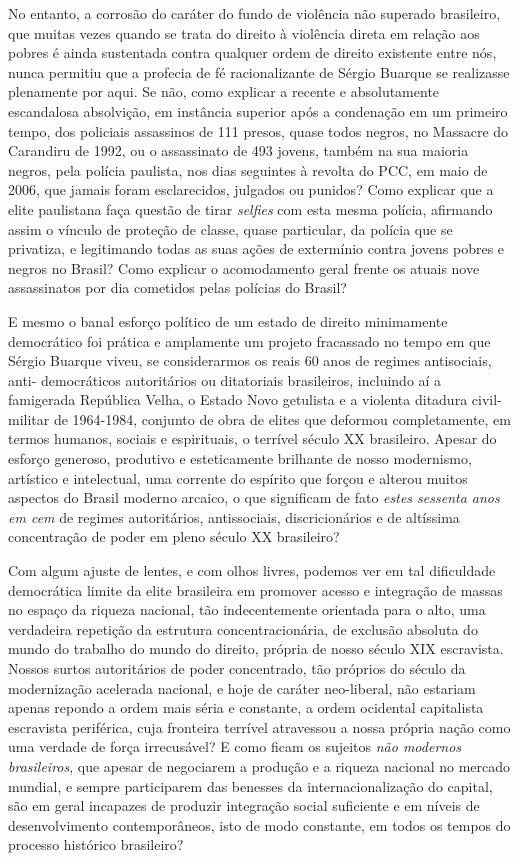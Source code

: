No entanto, a corrosão do caráter do fundo de violência não superado
brasileiro, que muitas vezes quando se trata do direito à violência
direta em relação aos pobres é ainda sustentada contra qualquer ordem de
direito existente entre nós, nunca permitiu que a profecia de fé
racionalizante de Sérgio Buarque se realizasse plenamente por aqui. Se
não, como explicar a recente e absolutamente escandalosa absolvição, em
instância superior após a condenação em um primeiro tempo, dos policiais
assassinos de 111 presos, quase todos negros, no Massacre do Carandiru
de 1992, ou o assassinato de 493 jovens, também na sua maioria negros,
pela polícia paulista, nos dias seguintes à revolta do PCC, em maio de
2006, que jamais foram esclarecidos, julgados ou punidos? Como explicar
que a elite paulistana faça questão de tirar \emph{selfies} com esta
mesma polícia, afirmando assim o vínculo de proteção de classe, quase
particular, da polícia que se privatiza, e legitimando todas as suas
ações de extermínio contra jovens pobres e negros no Brasil? Como
explicar o acomodamento geral frente os atuais nove assassinatos por dia
cometidos pelas polícias do Brasil?

E mesmo o banal esforço político de um estado de direito minimamente
democrático foi prática e amplamente um projeto fracassado no tempo em
que Sérgio Buarque viveu, se considerarmos os reais 60 anos de regimes
antisociais, anti- democráticos autoritários ou ditatoriais brasileiros,
incluindo aí a famigerada República Velha, o Estado Novo getulista e a
violenta ditadura civil-militar de 1964-1984, conjunto de obra de elites
que deformou completamente, em termos humanos, sociais e espirituais, o
terrível século XX brasileiro. Apesar do esforço generoso, produtivo e
esteticamente brilhante de nosso modernismo, artístico e intelectual,
uma corrente do espírito que forçou e alterou muitos aspectos do Brasil
moderno arcaico, o que significam de fato \emph{estes sessenta anos em
cem} de regimes autoritários, antissociais, discricionários e de
altíssima concentração de poder em pleno século XX brasileiro?

Com algum ajuste de lentes, e com olhos livres, podemos ver em tal
dificuldade democrática limite da elite brasileira em promover acesso e
integração de massas no espaço da riqueza nacional, tão indecentemente
orientada para o alto, uma verdadeira repetição da estrutura
concentracionária, de exclusão absoluta do mundo do trabalho do mundo do
direito, própria de nosso século XIX escravista. Nossos surtos
autoritários de poder concentrado, tão próprios do século da
modernização acelerada nacional, e hoje de caráter neo-liberal, não
estariam apenas repondo a ordem mais séria e constante, a ordem
ocidental capitalista escravista periférica, cuja fronteira terrível
atravessou a nossa própria nação como uma verdade de força irrecusável?
E como ficam os sujeitos \emph{não modernos brasileiros}, que apesar de
negociarem a produção e a riqueza nacional no mercado mundial, e sempre
participarem das benesses da internacionalização do capital, são em
geral incapazes de produzir integração social suficiente e em níveis de
desenvolvimento contemporâneos, isto de modo constante, em todos os
tempos do processo histórico brasileiro?

